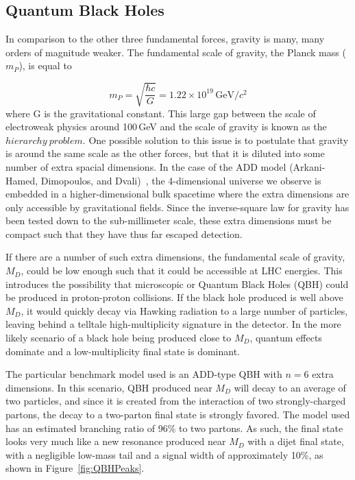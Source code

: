 \subsection{Quantum Black Holes}

In comparison to the other three fundamental forces, gravity is many, many orders of magnitude weaker.  The fundamental scale of gravity, the Planck mass ($m_P$), is equal to

\begin{equation}
m_P = \sqrt{\frac{\hbar c}{G}} = 1.22 \times 10^{19}\,\mathrm{GeV} / c^2
\end{equation}
where G is the gravitational constant.  This large gap between the scale of electroweak physics around 100\,GeV and the scale of gravity is known as the $hierarchy~problem$.  One possible solution to this issue is to postulate that gravity is around the same scale as the other forces, but that it is diluted into some number of extra spacial dimensions.  In the case of the ADD model (Arkani-Hamed, Dimopoulos, and Dvali)~\cite{ADD}, the 4-dimensional universe we observe is embedded in a higher-dimensional bulk spacetime where the extra dimensions are only accessible by gravitational fields.  Since the inverse-square law for gravity has been tested down to the sub-millimeter scale, these extra dimensions must be compact such that they have thus far escaped detection.

If there are a number of such extra dimensions, the fundamental scale of gravity, $M_D$, could be low enough such that it could be accessible at LHC energies.  This introduces the possibility that microscopic or Quantum Black Holes (QBH) could be produced in proton-proton collisions.  If the black hole produced is well above $M_D$, it would quickly decay via Hawking radiation to a large number of particles, leaving behind a telltale high-multiplicity signature in the detector.  In the more likely scenario of a black hole being produced close to $M_D$, quantum effects dominate and a low-multiplicity final state is dominant.\cite{QBH}

The particular benchmark model used is an ADD-type QBH with $n=6$ extra dimensions.  In this scenario, QBH produced near $M_D$ will decay to an average of two particles, and since it is created from the interaction of two strongly-charged partons, the decay to a two-parton final state is strongly favored.  The model used has an estimated branching ratio of 96\% to two partons.  As such, the final state looks very much like a new resonance produced near $M_D$ with a dijet final state, with a negligible low-mass tail and a signal width of approximately 10\%, as shown in Figure~\ref{fig:QBHPeaks}.


